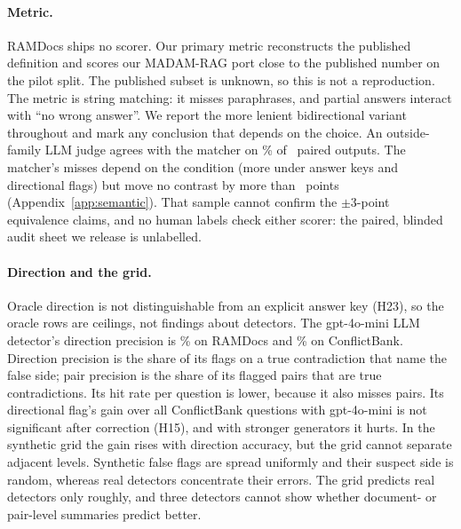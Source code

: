 \paragraph{Metric.} RAMDocs ships no scorer. Our primary metric reconstructs the published definition and scores our
MADAM-RAG port close to the published number on the pilot split. The published subset is unknown, so this is
not a reproduction. The metric is string matching: it misses paraphrases, and partial answers interact with ``no wrong
answer''. We report the more lenient bidirectional variant throughout and mark any conclusion that depends on the
choice. An outside-family LLM judge agrees with the matcher on \semAgree\% of \semN\ paired outputs. The matcher's
misses depend on the condition (more under answer keys and directional flags) but move no contrast by more than
\semDidMax\ points (Appendix~\ref{app:semantic}). That sample cannot confirm the $\pm$3-point equivalence claims, and
no human labels check either scorer: the paired, blinded audit sheet we release is unlabelled.

\paragraph{Direction and the grid.} Oracle direction is not distinguishable from an explicit answer key (H23), so the
oracle rows are ceilings, not findings about detectors. The gpt-4o-mini LLM detector's direction precision is
\dirAccLlm\% on RAMDocs and \cbDirAccLlm\% on ConflictBank. Direction precision is the share of its flags on a true
contradiction that name the false side; pair precision is the share of its flagged pairs that are
true contradictions. Its hit rate per question is lower, because it also misses pairs. Its directional flag's gain over
all ConflictBank questions with gpt-4o-mini is not significant after correction (H15), and with stronger generators it
hurts. In the synthetic grid the gain rises with direction accuracy, but the grid cannot separate adjacent levels.
Synthetic false flags are spread uniformly and their suspect side is random, whereas real detectors concentrate their
errors. The grid predicts real detectors only roughly, and three detectors cannot show whether document- or pair-level
summaries predict better.

